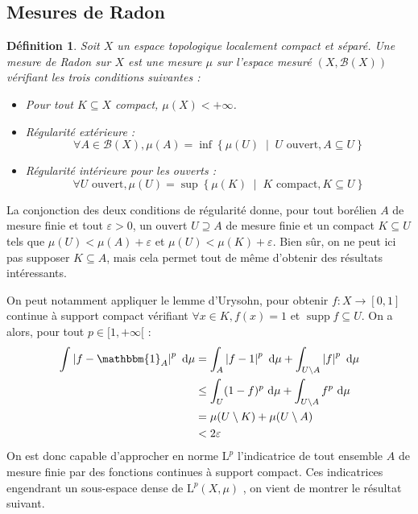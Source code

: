 \documentclass[a4paper,12pt]{article}
\newtheorem{definition}[theorem]{Définition}
\newcommand{\Bor}{\mathcal{B}}
\newcommand{\abs}[1]{\left\vert#1\right\vert}
\newcommand{\set}[1]{\left\{ #1 \right\}}
\newcommand{\indic}{\mathbbm{1}}
\newcommand{\integral}[4]{\int_{#1}^{#2} #3~\mathrm{d}#4}
\newcommand{\tq}{\;\middle|\;}
\newcommand{\TODO}[1]{}%
\DeclareMathOperator{\Supp}{supp}
\begin{document}
\subsection*{Mesures de Radon}

\begin{definition}
    Soit $X$ un espace topologique localement compact et séparé. Une \emph{mesure de Radon} sur $X$
    est une mesure $\mu$ sur l'espace mesuré $(X, \Bor(X))$ vérifiant les trois conditions suivantes :
    \begin{itemize}
        \item Pour tout $K\subseteq X$ compact, $\mu(X)<+\infty$.
        \item Régularité extérieure : 
        \begin{equation*}
            \forall A\in\Bor(X), \mu(A) = \inf \set{\mu(U) \tq U\text{ ouvert}, A\subseteq U}
        \end{equation*}
        \item Régularité intérieure pour les ouverts : 
        \begin{equation*}
            \forall U\text{ ouvert}, \mu(U) = \sup \set{\mu(K) \tq K\text{ compact}, K\subseteq U}
        \end{equation*}
    \end{itemize}
\end{definition}

La conjonction des deux conditions de régularité donne, pour tout borélien $A$ de mesure finie et tout $\varepsilon>0$,
un ouvert $U\supseteq A$ de mesure finie et un compact $K\subseteq U$ tels que $\mu(U)<\mu(A)+\varepsilon$ et 
$\mu(U)<\mu(K)+\varepsilon$. Bien sûr, on ne peut ici pas supposer $K\subseteq A$, mais cela permet 
tout de même d'obtenir des résultats intéressants.

On peut notamment appliquer le lemme d'Urysohn, pour obtenir $f:X\to[0,1]$ continue à support compact
vérifiant $\forall x\in K, f(x) = 1$ et $\Supp f\subseteq U$. On a alors, pour tout $p\in[1, +\infty[$ : 
\begin{align*}
    \integral{}{}{\abs{f-\indic_A}^p}{\mu} 
        &= \integral{A}{}{\abs{f-1}^p}{\mu} + \integral{U\setminus A}{}{\abs{f}^p}{\mu} \\
        &\le \integral{U}{}{(1-f)^p}{\mu} + \integral{U\setminus A}{}{f^p}{\mu} \\
        &= \mu(U\setminus K) + \mu(U\setminus A) \\
        &< 2\varepsilon
\end{align*}
On est donc capable d'approcher en norme $\mathrm{L}^p$ l'indicatrice de tout ensemble $A$ de mesure finie par des fonctions continues 
à support compact. Ces indicatrices engendrant un sous-espace dense de $\mathrm{L}^p(X, \mu)$ \TODO{ref}, on vient de montrer le résultat suivant.
\end{document}
